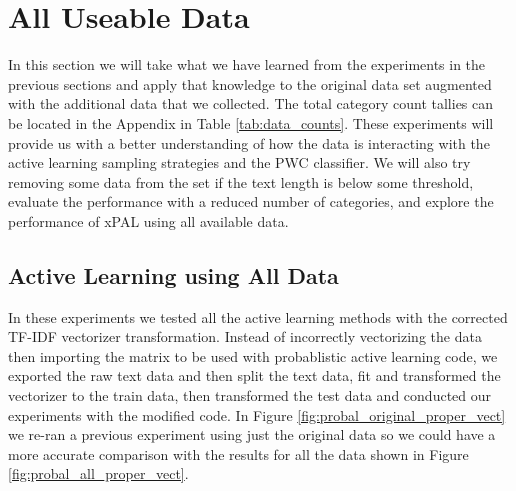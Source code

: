 \section{All Useable Data}
\label{sec:proper_vectorization}

In this section we will take what we have learned from the experiments in the previous sections and apply that knowledge to the original data set augmented with the additional data that we collected. The total category count tallies can be located in the Appendix in Table \ref{tab:data_counts}. These experiments will provide us with a better understanding of how the data is interacting with the active learning sampling strategies and the PWC classifier. We will also try removing some data from the set if the text length is below some threshold, evaluate the performance with a reduced number of categories, and explore the performance of xPAL using all available data.

\subsection{Active Learning using All Data}

In these experiments we tested all the active learning methods with the corrected TF-IDF vectorizer transformation. Instead of incorrectly vectorizing the data then importing the matrix to be used with \cite{kottke2021toward} probablistic active learning code, we exported the raw text data and then split the text data, fit and transformed the vectorizer to the train data, then transformed the test data and conducted our experiments with the modified code. In Figure \ref{fig:probal_original_proper_vect} we re-ran a previous experiment using just the original data so we could have a more accurate comparison with the results for all the data shown in Figure \ref{fig:probal_all_proper_vect}.


